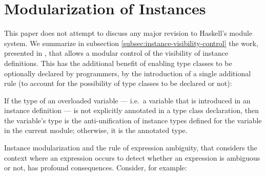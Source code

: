 \section{Modularization of Instances}
\label{sec:modular-instances}

This paper does not attempt to discuss any major revision to Haskell's
module system. We summarize in subsection
\ref{subsec:instance-visibility-control} the work, presented in
\cite{Controlling-scope-instances}, that allows a modular control of
the visibility of instance definitions. This has the additional
benefit of enabling type classes to be optionally declared by
programmers, by the introduction of a single additional rule (to
account for the possibility of type classes to be declared or not):

\begin{definition}

If the type of an overloaded variable --- i.e.~a variable that is
introduced in an instance definition --- is not explicitly annotated
in a type class declaration, then the variable's type is the
anti-unification of instance types defined for the variable in the
current module; otherwise, it is the annotated type.

\label{overloaded-variable-type}
\end{definition}

Instance modularization and the rule of expression ambiguity, that
considers the context where an expression occurs to detect whether an
expression is ambiguous or not, has profound consequences. Consider,
for example:


